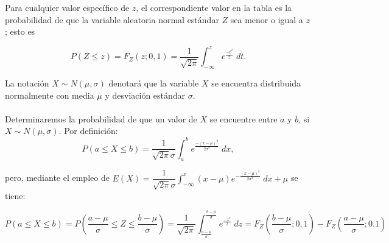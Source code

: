 Para cualquier valor específico de $z$, el correspondiente valor en la tabla es la probabilidad de que la variable aleatoria normal estándar $Z$ sea menor o igual a $z$; esto es
\begin{tcolorbox}
    $$P(Z\leq z)=F_Z(z;0,1) = \dfrac{1}{\sqrt{2\pi}}\int_{-\infty}^z e^{\frac{-t^2}{2}}\; dt.$$
\end{tcolorbox}

La notación $X\sim N(\mu,\sigma)$ denotará que la variable $X$ se encuentra distribuida normalmente con media $\mu$ y desviación estándar $\sigma$.\\\\
Determinaremos la probabilidad de que un valor de $X$ se encuentre entre $a$ y $b$, si $X\sim N(\mu,\sigma)$. Por definición:
$$P(a\leq X\leq b) = \dfrac{1}{\sqrt{2\pi}\sigma} \int_a^b e^{\frac{-(x-\mu)^2}{2\sigma^2}}\; dx,$$

pero, mediante el empleo de $E(X)=\displaystyle\dfrac{1}{\sqrt{2\pi}\sigma}\int_{-\infty}^x (x-\mu)e^{-\frac{(x-\mu)^2}{2\sigma^2}}\; dx + \mu$ se tiene:

\begin{tcolorbox}
    $$P(a\leq X\leq b) = P\left(\dfrac{a-\mu}{\sigma}\leq Z \leq \dfrac{b-\mu}{\sigma}\right) = \dfrac{1}{\sqrt{2\pi}}\int_{\frac{a-\mu}{\sigma}}^{\frac{b-\mu}{\sigma}} e^{\frac{-z^2}{2}}\; dz = F_Z\left(\dfrac{b-\mu}{\sigma};0,1\right)-F_Z\left(\dfrac{a-\mu}{\sigma};0.1\right)$$
\end{tcolorbox}


